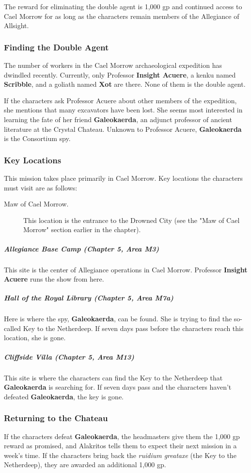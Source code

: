 \documentclass[10pt,a4paper,twoside,bg=print,twocolumn,openany,nodeprecatedcode]{dndbook}
\begin{document}
The reward for eliminating the double agent is 1,000 gp and continued access to Cael Morrow for as long as the characters remain members of the Allegiance of Allsight.

\subsubsection{Finding the Double Agent}
The number of workers in the Cael Morrow archaeological expedition has dwindled recently. Currently, only Professor \textbf{Insight Acuere}, a kenku named \textbf{Scribble}, and a goliath named \textbf{Xot} are there. None of them is the double agent.

If the characters ask Professor Acuere about other members of the expedition, she mentions that many excavators have been lost. She seems most interested in learning the fate of her friend \textbf{Galeokaerda}, an adjunct professor of ancient literature at the Crystal Chateau. Unknown to Professor Acuere, \textbf{Galeokaerda} is the Consortium spy.

\subsubsection{Key Locations}
This mission takes place primarily in Cael Morrow. Key locations the characters must visit are as follows:


\begin{description}
\item[Maw of Cael Morrow.]
This location is the entrance to the Drowned City (see the "Maw of Cael Morrow" section earlier in the chapter).
\end{description}

\subparagraph{Allegiance Base Camp (Chapter 5, Area M3)}
This site is the center of Allegiance operations in Cael Morrow. Professor \textbf{Insight Acuere} runs the show from here.

\subparagraph{Hall of the Royal Library (Chapter 5, Area M7a)}
Here is where the spy, \textbf{Galeokaerda}, can be found. She is trying to find the so-called Key to the Netherdeep. If seven days pass before the characters reach this location, she is gone.

\subparagraph{Cliffside Villa (Chapter 5, Area M13)}
This site is where the characters can find the Key to the Netherdeep that \textbf{Galeokaerda} is searching for. If seven days pass and the characters haven't defeated \textbf{Galeokaerda}, the key is gone.

\subsubsection{Returning to the Chateau}
If the characters defeat \textbf{Galeokaerda}, the headmasters give them the 1,000 gp reward as promised, and Alakritos tells them to expect their next mission in a week's time. If the characters bring back the \textit{ruidium greataxe} (the Key to the Netherdeep), they are awarded an additional 1,000 gp.
\end{document}
